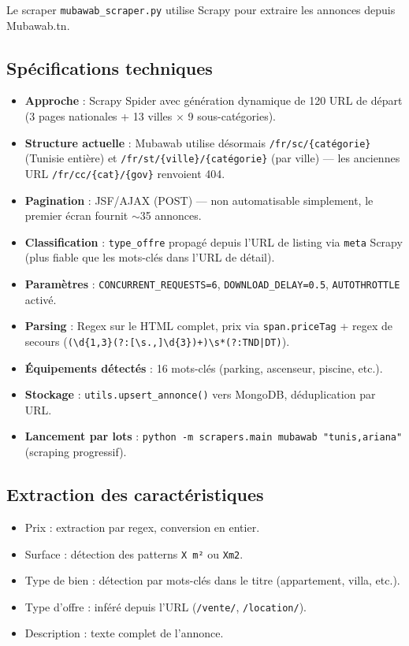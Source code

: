 \documentclass[12pt,a4paper]{report}
\begin{document}
Le scraper \texttt{mubawab\_scraper.py} utilise Scrapy pour extraire les annonces depuis Mubawab.tn.

\subsection{Spécifications techniques}
\begin{itemize}
    \item \textbf{Approche} : Scrapy Spider avec génération dynamique de 120 URL de départ (3 pages nationales + 13 villes $\times$ 9 sous-catégories).
    \item \textbf{Structure actuelle} : Mubawab utilise désormais \texttt{/fr/sc/\{catégorie\}} (Tunisie entière) et \texttt{/fr/st/\{ville\}/\{catégorie\}} (par ville) — les anciennes URL \texttt{/fr/cc/\{cat\}/\{gov\}} renvoient 404.
    \item \textbf{Pagination} : JSF/AJAX (POST) — non automatisable simplement, le premier écran fournit $\sim$35 annonces.
    \item \textbf{Classification} : \texttt{type\_offre} propagé depuis l'URL de listing via \texttt{meta} Scrapy (plus fiable que les mots-clés dans l'URL de détail).
    \item \textbf{Paramètres} : \texttt{CONCURRENT\_REQUESTS=6}, \texttt{DOWNLOAD\_DELAY=0.5}, \texttt{AUTOTHROTTLE} activé.
    \item \textbf{Parsing} : Regex sur le HTML complet, prix via \texttt{span.priceTag} + regex de secours (\texttt{(\textbackslash d\{1,3\}(?:[\textbackslash s.,]\textbackslash d\{3\})+)\textbackslash s*(?:TND|DT)}).
    \item \textbf{Équipements détectés} : 16 mots-clés (parking, ascenseur, piscine, etc.).
    \item \textbf{Stockage} : \texttt{utils.upsert\_annonce()} vers MongoDB, déduplication par URL.
    \item \textbf{Lancement par lots} : \texttt{python -m scrapers.main mubawab "tunis,ariana"} (scraping progressif).
\end{itemize}

\subsection{Extraction des caractéristiques}
\begin{itemize}
    \item Prix : extraction par regex, conversion en entier.
    \item Surface : détection des patterns \texttt{X m²} ou \texttt{Xm2}.
    \item Type de bien : détection par mots-clés dans le titre (appartement, villa, etc.).
    \item Type d'offre : inféré depuis l'URL (\texttt{/vente/}, \texttt{/location/}).
    \item Description : texte complet de l'annonce.
\end{itemize}
\end{document}
